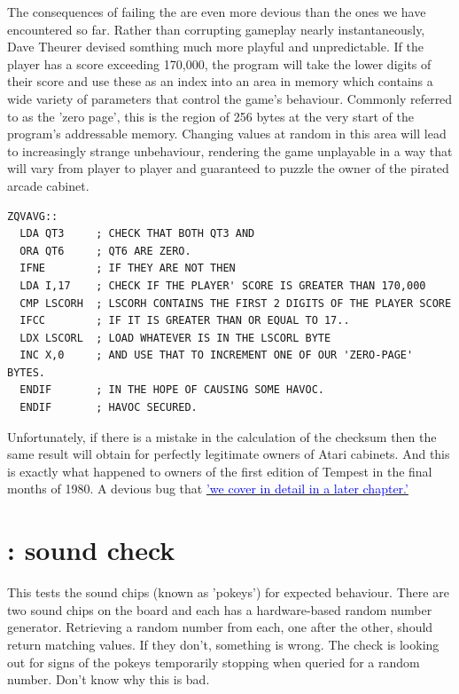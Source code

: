 The consequences of failing the  are even more devious than the ones
we have encountered so far. Rather than corrupting gameplay nearly instantaneously,
Dave Theurer devised somthing much more playful and unpredictable. If the player
has a score exceeding 170,000, the program will take the lower digits of their score
and use these as an index into an area in memory which contains a wide variety of 
parameters that control the game's behaviour. Commonly referred to as the 'zero page',
this is the region of 256 bytes at the very start of the program's addressable memory.
Changing values at random in this area will lead to increasingly strange unbehaviour,
rendering the game unplayable in a way that will vary from player to player and guaranteed
to puzzle the owner of the pirated arcade cabinet.

\begin{lstlisting}
ZQVAVG::
  LDA QT3     ; CHECK THAT BOTH QT3 AND
  ORA QT6     ; QT6 ARE ZERO.
  IFNE        ; IF THEY ARE NOT THEN
  LDA I,17    ; CHECK IF THE PLAYER' SCORE IS GREATER THAN 170,000
  CMP LSCORH  ; LSCORH CONTAINS THE FIRST 2 DIGITS OF THE PLAYER SCORE
  IFCC        ; IF IT IS GREATER THAN OR EQUAL TO 17..
  LDX LSCORL  ; LOAD WHATEVER IS IN THE LSCORL BYTE
  INC X,0     ; AND USE THAT TO INCREMENT ONE OF OUR 'ZERO-PAGE' BYTES.
  ENDIF       ; IN THE HOPE OF CAUSING SOME HAVOC.
  ENDIF       ; HAVOC SECURED.
\end{lstlisting}

Unfortunately, if there is a mistake
in the calculation of the checksum then the same result will obtain for perfectly legitimate
owners of Atari cabinets. And this is exactly what happened to owners of the first edition
of Tempest in the final months of 1980. A devious bug that 
\hyperref[sec:tempest_program_bug]{\textcolor{blue}{'we cover in detail in a later chapter.'}} 
\section*{: sound check}
This tests the sound chips (known as 'pokeys') for expected behaviour. There are two sound chips on the 
board and each has a hardware-based random number generator. Retrieving a random number
from each, one after the other, should return matching values. If they don't, something is wrong.
The check is looking out for signs of the pokeys temporarily stopping when queried for a random
number. Don't know why this is bad.

